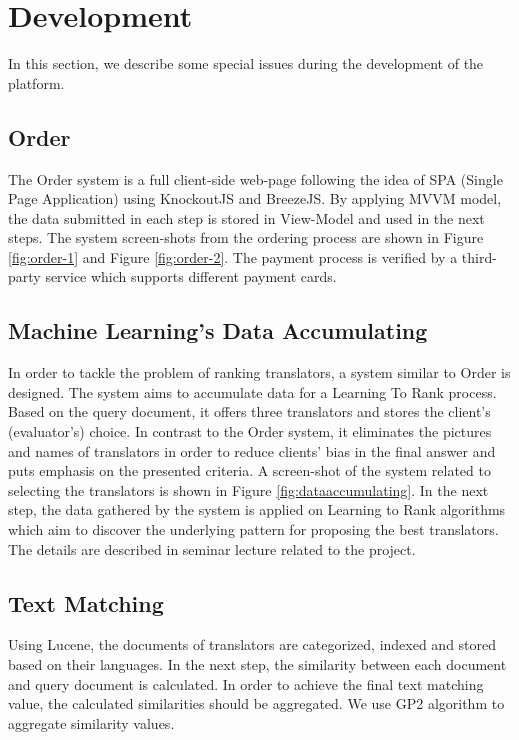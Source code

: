 \section{Development}
\label{sec:development}
In this section, we describe some special issues during the development of the platform.

\subsection{Order}
The Order system is a full client-side web-page following the idea of SPA (Single Page Application) using KnockoutJS and BreezeJS. By applying MVVM model, the data submitted in each step is stored in View-Model and used in the next steps. The system screen-shots from the ordering process are shown in Figure \ref{fig:order-1} and Figure \ref{fig:order-2}.  The payment process is verified by a third-party service which supports different payment cards.

\subsection{Machine Learning's Data Accumulating}
In order to tackle the problem of ranking translators, a system similar to Order is designed. The system aims to accumulate data for a Learning To Rank process. Based on the query document, it offers three translators and stores the client's (evaluator's) choice. In contrast to the Order system, it eliminates the pictures and names of translators in order to reduce clients' bias in the final answer and puts emphasis on the presented criteria. A screen-shot of the system related to selecting the translators is shown in Figure \ref{fig:dataaccumulating}. In the next step, the data gathered by the system is applied on Learning to Rank algorithms which aim to discover the underlying pattern for proposing the best translators. The details are described in seminar lecture related to the project. 

\subsection{Text Matching}
Using Lucene, the documents of translators are categorized, indexed and stored based on their languages. In the next step, the similarity between each document and query document is calculated. In order to achieve the final text matching value, the calculated similarities should be aggregated. We use GP2\cite{gp2} algorithm to aggregate similarity values.

